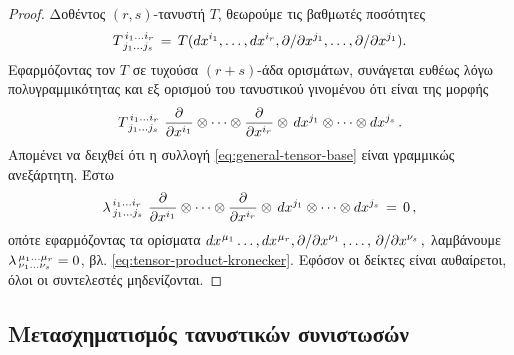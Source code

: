 \documentclass[11pt,a4paper,twoside,openright]{book}
\begin{document}
\begin{proof}
Δοθέντος $(r,s)$-τανυστή $T$,
θεωρούμε τις βαθμωτές ποσότητες
\begin{equation*}
T^{\,i_1 \dots i_r}_{\hspace{1.5pt}j_1 \dots j_s}
\,
=
\,
T(
dx^{i_1}, \dots, dx^{i_r},
\partial/\partial x^{j_1}, \dots, \partial/\partial x^{j_1}).
\end{equation*}
Εφαρμόζοντας τον $Τ$ σε τυχούσα $(r+s)$-άδα ορισμάτων,
συνάγεται ευθέως λόγω πολυγραμμικότητας και εξ ορισμού του τανυστικού γινομένου ότι είναι της μορφής
\begin{equation*}
T^{\,i_1 \dots i_r}_{\hspace{1.5pt}j_1 \dots j_s}
\,\,
\frac{\partial}{\partial x^{i_1}} \otimes \dots \otimes \frac{\partial}{\partial x^{i_r}}
\otimes
\,dx^{j_1} \otimes \dots \otimes dx^{j_s}\,.
\end{equation*}
Απομένει να δειχθεί ότι η συλλογή \eqref{eq:general-tensor-base}
είναι γραμμικώς ανεξάρτητη. Έστω
\begin{equation*}
\lambda^{\,i_1 \dots i_r}_{\hspace{1.5pt}j_1 \dots j_s}
\,\,
\frac{\partial}{\partial x^{i_1}} \otimes \dots \otimes \frac{\partial}{\partial x^{i_r}}
\otimes
\,dx^{j_1} \otimes \dots \otimes dx^{j_s}
\,
=
\,
0
\,,
\end{equation*}
οπότε εφαρμόζοντας τα ορίσματα
$
dx^{\hspace{.5pt}\mu_1}
\dots,
dx^{\hspace{.5pt}\mu_r},
\partial/\partial x^{\nu_1}\,,
\dots,\,
\partial/\partial x^{\nu_s}\,,
$
λαμβάνουμε $\lambda^{\hspace{1.5pt}\mu_1 \dots \mu_r}_{\hspace{1.5pt}\nu_1 \dots \nu_s}
=
0$, βλ. \eqref{eq:tensor-product-kronecker}.
Εφόσον οι δείκτες είναι αυθαίρετοι, όλοι οι συντελεστές μηδενίζονται.
\end{proof}

\subsection{Μετασχηματισμός τανυστικών συνιστωσών}
	\label{sec:tensor-components-transform}
\end{document}
